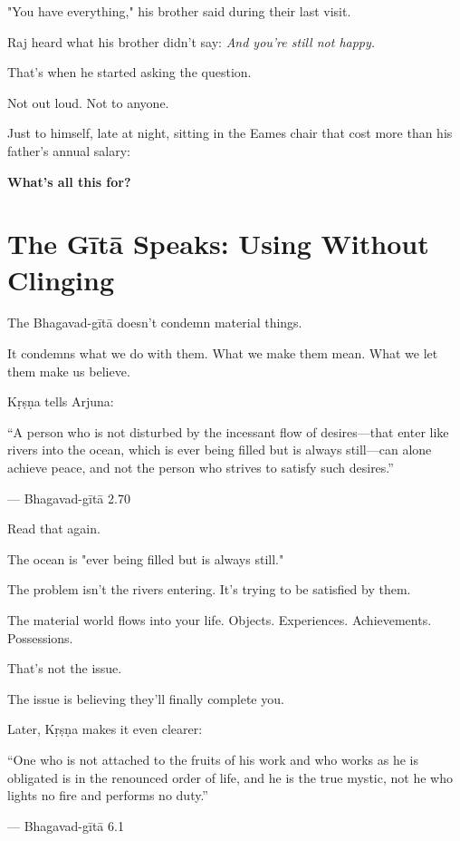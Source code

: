 \documentclass[11pt,twoside]{book}
\begin{document}
"You have everything," his brother said during their last visit.

Raj heard what his brother didn't say: \emph{And you're still not happy.}

That's when he started asking the question.

Not out loud. Not to anyone.

Just to himself, late at night, sitting in the Eames chair that cost more than his father's annual salary:

\textbf{What's all this for?}

\section*{The Gītā Speaks: Using Without Clinging}

The Bhagavad-gītā doesn't condemn material things.

It condemns what we do with them. What we make them mean. What we let them make us believe.

Kṛṣṇa tells Arjuna:

\begin{pullquote}
``A person who is not disturbed by the incessant flow of desires—that enter like rivers into the ocean, which is ever being filled but is always still—can alone achieve peace, and not the person who strives to satisfy such desires.''

--- Bhagavad-gītā 2.70
\end{pullquote}

Read that again.

The ocean is "ever being filled but is always still."

The problem isn't the rivers entering. It's trying to be satisfied by them.

The material world flows into your life. Objects. Experiences. Achievements. Possessions.

That's not the issue.

The issue is believing they'll finally complete you.

Later, Kṛṣṇa makes it even clearer:

\begin{pullquote}
``One who is not attached to the fruits of his work and who works as he is obligated is in the renounced order of life, and he is the true mystic, not he who lights no fire and performs no duty.''

--- Bhagavad-gītā 6.1
\end{pullquote}
\end{document}
